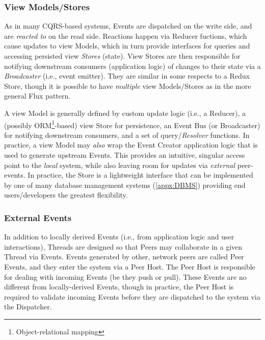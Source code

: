 \documentclass{textile}
\begin{document}

\subsubsection{View Models/Stores}\label{sec:views}

As in many CQRS-based systems, Events are dispatched on the write side, and are \emph{reacted to} on the read side. Reactions happen via Reducer fuctions, which cause updates to view Models, which in turn provide interfaces for queries and accessing persisted view \emph{Stores} (state). View Stores are then responsible for notifying downstream consumers (application logic) of changes to their state via a \emph{Broadcaster} (i.e., event emitter). They are similar in some respects to a Redux Store, though it is possible to have \emph{multiple} view Models/Stores as in the more general Flux pattern.

A view Model is generally defined by custom update logic (i.e., a Reducer), a (possibly ORM\footnote{Object-relational mapping}-based) view Store for persistence, an Event Bus (or Broadcaster) for notifying downstream consumers, and a set of query/\emph{Resolver} \cite{ereminReduxInspiredBackend2019} functions. In practice, a view Model may \emph{also} wrap the Event Creator application logic that is used to generate upstream Events. This provides an intuitive, singular access point to the \emph{local} system, while also leaving room for updates via \emph{external} peer-events. In practice, the Store is a lightweight interface that can be implemented by one of many database management systems (\ref{appx:DBMS}) providing end users/developers the greatest flexibility.

\subsubsection{External Events}\label{sec:external}

In addition to locally derived Events (i.e., from application logic and user interactions), Threads are designed so that Peers may collaborate in a given Thread via Events. Events generated by other, network peers are called Peer Events, and they enter the system via a Peer Host. The Peer Host is responsible for dealing with incoming Events (be they push or pull). These Events are no different from locally-derived Events, though in practice, the Peer Host is required to validate incoming Events before they are dispatched to the system via the Dispatcher.
\end{document}
